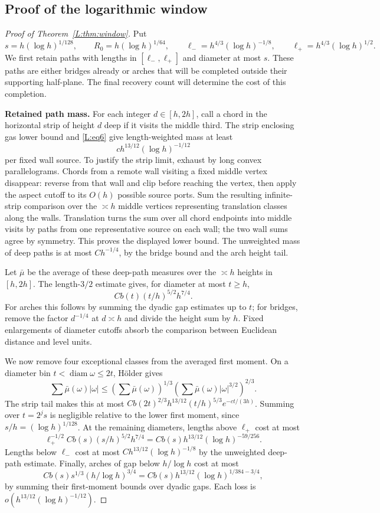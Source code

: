\subsection{Proof of the logarithmic window}\label{L:step20}
\begin{proof}[Proof of Theorem~\ref{L:thm:window}]
Put
\[
 s=h(\log h)^{1/128},\qquad R_0=h(\log h)^{1/64},\qquad
 \ell_-=h^{4/3}(\log h)^{-1/8},\qquad
 \ell_+=h^{4/3}(\log h)^{1/2}.
\]
We first retain paths with lengths in $[\ell_-,\ell_+]$ and diameter
at most $s$.  These paths are either bridges already or arches that
will be completed outside their supporting half-plane.  The final
recovery count will determine the cost of this completion.

\medskip\noindent\textbf{Retained path mass.}
For each integer $d\in[h,2h]$, call a chord in the horizontal strip
of height $d$ deep if it visits the middle third.  The strip enclosing
gas lower bound and \eqref{L:eq6} give length-weighted mass at least
\[
 c h^{13/12}(\log h)^{-1/12}
\]
per fixed wall source.  To justify the strip limit, exhaust by long
convex parallelograms.  Chords from a remote wall visiting a fixed
middle vertex disappear: reverse from that wall and clip before
reaching the vertex, then apply the aspect cutoff to its $O(h)$
possible source ports.  Sum the resulting infinite-strip comparison
over the $\asymp h$ middle vertices representing translation classes
along the walls.  Translation turns the sum over all chord endpoints
into middle visits by paths from one representative source on each
wall; the two wall sums agree by symmetry.  This proves the displayed
lower bound.  The unweighted mass of deep paths is at most
$Ch^{-1/4}$, by the bridge bound and the arch height tail.

Let $\bar\mu$ be the average of these deep-path measures over the
$\asymp h$ heights in $[h,2h]$.
The length-$3/2$ estimate gives, for diameter at most $t\ge h$,
\[
 Cb(t)(t/h)^{5/2}h^{7/4}.
\]
For arches this follows by summing the dyadic gap estimates up to
$t$; for bridges, remove the factor $d^{-1/4}$ at $d\asymp h$
and divide the height sum by $h$.  Fixed enlargements of diameter
cutoffs absorb the comparison between Euclidean distance and level
units.

We now remove four exceptional classes from the averaged first
moment.  On a diameter bin $t<\operatorname{diam}\omega\le2t$,
H\"older gives
\[
 \sum\bar\mu(\omega)|\omega|
 \le\left(\sum\bar\mu(\omega)\right)^{1/3}
      \left(\sum\bar\mu(\omega)|\omega|^{3/2}\right)^{2/3}.
\]
The strip tail makes this at most
$Cb(2t)^{2/3}h^{13/12}(t/h)^{5/3}e^{-ct/(3h)}$.
Summing over $t=2^js$ is negligible relative to the lower first
moment, since $s/h=(\log h)^{1/128}$.
At the remaining diameters, lengths above $\ell_+$ cost at most
\[
 \ell_+^{-1/2}Cb(s)(s/h)^{5/2}h^{7/4}
 =Cb(s)h^{13/12}(\log h)^{-59/256}.
\]
Lengths below $\ell_-$ cost at most
$Ch^{13/12}(\log h)^{-1/8}$ by the unweighted deep-path estimate.
Finally, arches of gap below $h/\log h$ cost at most
\[
 Cb(s)s^{1/3}(h/\log h)^{3/4}
 =Cb(s)h^{13/12}(\log h)^{1/384-3/4},
\]
by summing their first-moment bounds over dyadic gaps.
Each loss is $o(h^{13/12}(\log h)^{-1/12})$.


\end{proof}
